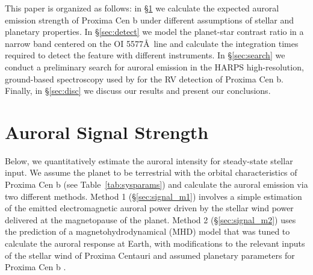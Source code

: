 \documentclass{emulateapj}
\newcommand{\XXX}[1]{#1}      %
\begin{document}
This paper is organized as follows: in \S\ref{sec:signal} we calculate the expected auroral emission strength of Proxima Cen b under different assumptions of stellar and planetary properties. In \S\ref{sec:detect} we model the planet-star contrast ratio in a narrow band centered on the OI 5577\AA\ line and calculate the integration times required to detect the feature with different instruments. In \S\ref{sec:search} we conduct a preliminary search for auroral emission in the HARPS high-resolution, ground-based spectroscopy used by \citet{Anglada-Escude2016} for the RV detection of Proxima Cen b. Finally, in \S\ref{sec:disc} we discuss our results and present our conclusions.

%
%
%


\section{Auroral Signal Strength}
\label{sec:signal}

\XXX{Below, we quantitatively estimate the auroral intensity for steady-state stellar input. We assume the planet to be terrestrial with the orbital characteristics of Proxima Cen b (see Table~\ref{tab:sysparams}) and calculate the auroral emission via two different methods}. Method 1 (\S\ref{sec:signal_m1}) involves a simple estimation of the emitted electromagnetic auroral power driven by the stellar wind power delivered at the magnetopause of the planet. Method 2 (\S\ref{sec:signal_m2}) uses the prediction of a magnetohydrodynamical (MHD) model that was tuned to calculate the auroral response at Earth, with modifications to the relevant inputs of the stellar wind of Proxima Centauri and assumed planetary parameters for Proxima Cen b \citep{Anglada-Escude2016}. 
\end{document}
